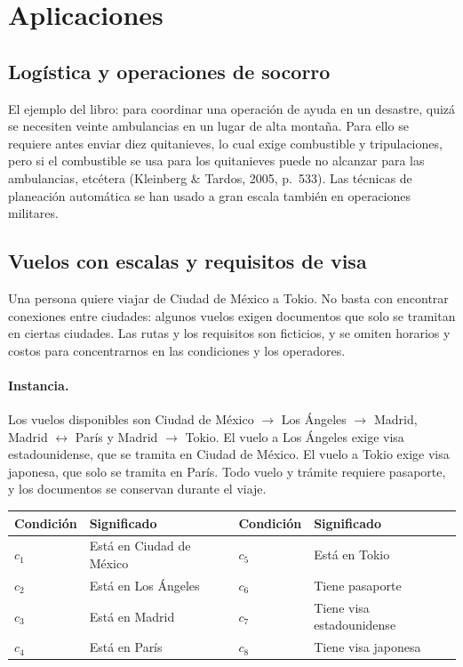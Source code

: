 \documentclass[11pt,letterpaper]{article}
\theoremstyle{plain}
\theoremstyle{definition}
\theoremstyle{remark}
\begin{document}
\section{Aplicaciones}\label{sec:aplicaciones}


\subsection{Logística y operaciones de socorro}
El ejemplo del libro: para coordinar una operación de ayuda en un desastre, quizá se necesiten veinte ambulancias en un lugar de alta montaña. Para ello se requiere antes enviar diez quitanieves, lo cual exige combustible y tripulaciones, pero si el combustible se usa para los quitanieves puede no alcanzar para las ambulancias, etcétera
(Kleinberg \& Tardos, 2005, p.~533). Las técnicas de planeación automática se han usado a gran escala también en operaciones militares.







\subsection{Vuelos con escalas y requisitos de visa}
\label{sec:vuelos}

Una persona quiere viajar de Ciudad de México a Tokio.
No basta con encontrar conexiones entre ciudades: algunos
vuelos exigen documentos que solo se tramitan en ciertas
ciudades. Las rutas y los requisitos son ficticios, y se
omiten horarios y costos para concentrarnos en las
condiciones y los operadores.

\paragraph{Instancia.}
Los vuelos disponibles son Ciudad de México $\to$ Los Ángeles
$\to$ Madrid, Madrid $\leftrightarrow$ París y
Madrid $\to$ Tokio. El vuelo a Los Ángeles exige visa
estadounidense, que se tramita en Ciudad de México. El vuelo
a Tokio exige visa japonesa, que solo se tramita en París.
Todo vuelo y trámite requiere pasaporte, y los documentos
se conservan durante el viaje.

\begin{center}
\small
\begin{tabular}{@{}ll@{\qquad}ll@{}}
\toprule
Condición & Significado & Condición & Significado\\
\midrule
$c_1$ & Está en Ciudad de México & $c_5$ & Está en Tokio\\
$c_2$ & Está en Los Ángeles      & $c_6$ & Tiene pasaporte\\
$c_3$ & Está en Madrid           & $c_7$ & Tiene visa estadounidense\\
$c_4$ & Está en París            & $c_8$ & Tiene visa japonesa\\
\bottomrule
\end{tabular}
\end{center}
\end{document}
